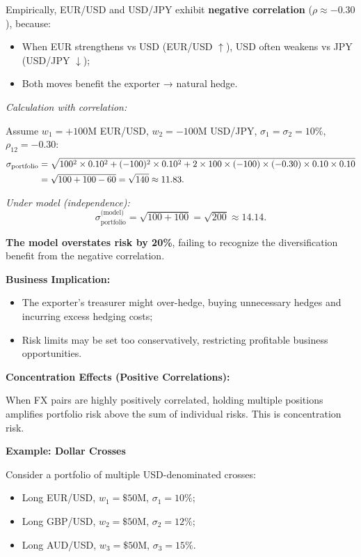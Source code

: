 Empirically, EUR/USD and USD/JPY exhibit \textbf{negative correlation} ($\rho \approx -0.30$), because:
\begin{itemize}
	\item When EUR strengthens vs USD (EUR/USD $\uparrow$), USD often weakens vs JPY (USD/JPY $\downarrow$);
	\item Both moves benefit the exporter → natural hedge.
\end{itemize}

\textit{Calculation with correlation:}

Assume $w_1 = +100$M EUR/USD, $w_2 = -100$M USD/JPY, $\sigma_1 = \sigma_2 = 10\%$, $\rho_{12} = -0.30$:
\begin{align}
	\sigma_{\text{portfolio}} &= \sqrt{100^2 \times 0.10^2 + (-100)^2 \times 0.10^2 + 2 \times 100 \times (-100) \times (-0.30) \times 0.10 \times 0.10} \notag \\
	&= \sqrt{100 + 100 - 60} = \sqrt{140} \approx 11.83.
\end{align}

\textit{Under model (independence):}
\begin{equation}
	\sigma_{\text{portfolio}}^{\text{(model)}} = \sqrt{100 + 100} = \sqrt{200} \approx 14.14.
\end{equation}

\textbf{The model overstates risk by 20\%}, failing to recognize the diversification benefit from the negative correlation.

\textbf{Business Implication:} 
\begin{itemize}
	\item The exporter's treasurer might over-hedge, buying unnecessary hedges and incurring excess hedging costs;
	\item Risk limits may be set too conservatively, restricting profitable business opportunities.
\end{itemize}

\textbf{Concentration Effects (Positive Correlations):}

When FX pairs are highly positively correlated, holding multiple positions amplifies portfolio risk above the sum of individual risks. This is concentration risk.

\textbf{Example: Dollar Crosses}

Consider a portfolio of multiple USD-denominated crosses:
\begin{itemize}
	\item Long EUR/USD, $w_1 = \$50$M, $\sigma_1 = 10\%$;
	\item Long GBP/USD, $w_2 = \$50$M, $\sigma_2 = 12\%$;
	\item Long AUD/USD, $w_3 = \$50$M, $\sigma_3 = 15\%$.
\end{itemize}

